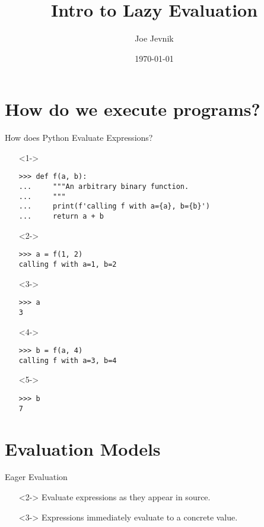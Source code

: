 \documentclass{beamer}
\title{Intro to Lazy Evaluation}
\date{\today}
\author{Joe Jevnik}
\institute{PyCon 2017}
\begin{document}
\maketitle

\section{How do we execute programs?}

\begin{frame}[fragile]{How does Python Evaluate Expressions?}
  \begin{itemize}
  \item[]<1-> \begin{verbatim}
>>> def f(a, b):
...     """An arbitrary binary function.
...     """
...     print(f'calling f with a={a}, b={b}')
...     return a + b
    \end{verbatim}
  \item[]<2-> \begin{verbatim}
>>> a = f(1, 2)
calling f with a=1, b=2
    \end{verbatim}
  \item[]<3-> \begin{verbatim}
>>> a
3
    \end{verbatim}
  \item[]<4-> \begin{verbatim}
>>> b = f(a, 4)
calling f with a=3, b=4
    \end{verbatim}
  \item[]<5-> \begin{verbatim}
>>> b
7
    \end{verbatim}
  \end{itemize}
\end{frame}

\section{Evaluation Models}

\begin{frame}{Eager Evaluation}
  \begin{definition}
    \begin{itemize}
    \item[]<2-> Evaluate expressions as they appear in source.
    \item[]<3-> Expressions immediately evaluate to a concrete value.
    \end{itemize}
  \end{definition}
\end{frame}
\end{document}
